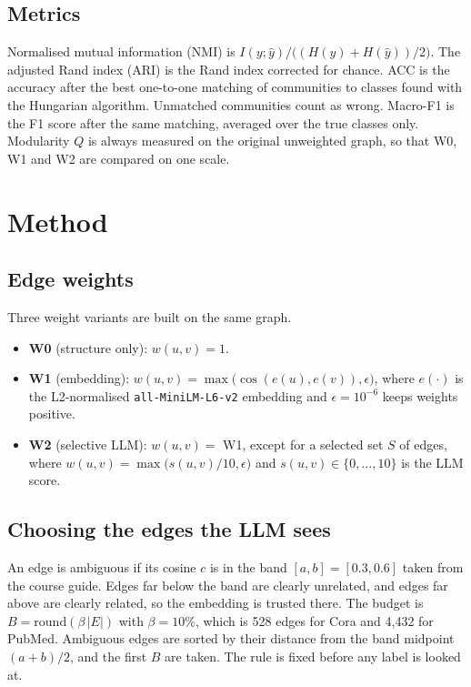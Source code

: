 \documentclass[journal]{IEEEtran}
\begin{document}
\subsection{Metrics}
Normalised mutual information (NMI) is $I(y;\hat{y})/\bigl((H(y)+H(\hat{y}))/2\bigr)$. The adjusted Rand index (ARI) is the Rand index corrected for chance. ACC is the accuracy after the best one-to-one matching of communities to classes found with the Hungarian algorithm. Unmatched communities count as wrong. Macro-F1 is the F1 score after the same matching, averaged over the true classes only. Modularity $Q$ is always measured on the original unweighted graph, so that W0, W1 and W2 are compared on one scale.

\section{Method}
\label{sec:method}
\subsection{Edge weights}
Three weight variants are built on the same graph.
\begin{itemize}
\item \textbf{W0} (structure only): $w(u,v)=1$.
\item \textbf{W1} (embedding): $w(u,v)=\max\bigl(\cos(e(u),e(v)),\epsilon\bigr)$, where $e(\cdot)$ is the L2-normalised \texttt{all-MiniLM-L6-v2} embedding \cite{reimers2019} and $\epsilon=10^{-6}$ keeps weights positive.
\item \textbf{W2} (selective LLM): $w(u,v)=$ W1, except for a selected set $S$ of edges, where $w(u,v)=\max\bigl(s(u,v)/10,\epsilon\bigr)$ and $s(u,v)\in\{0,\dots,10\}$ is the LLM score.
\end{itemize}

\subsection{Choosing the edges the LLM sees}
An edge is ambiguous if its cosine $c$ is in the band $[a,b]=[0.3,0.6]$ taken from the course guide. Edges far below the band are clearly unrelated, and edges far above are clearly related, so the embedding is trusted there. The budget is $B=\mathrm{round}(\beta\,|E|)$ with $\beta=10\%$, which is 528 edges for Cora and 4,432 for PubMed. Ambiguous edges are sorted by their distance from the band midpoint $(a+b)/2$, and the first $B$ are taken. The rule is fixed before any label is looked at.
\end{document}
